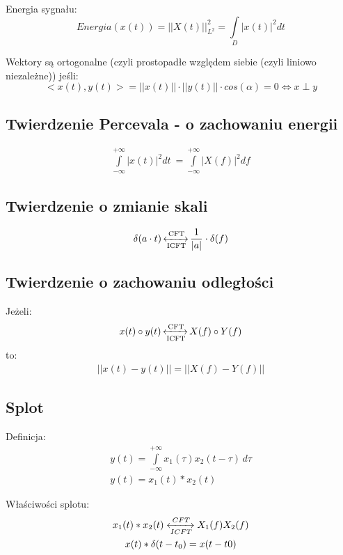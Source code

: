     \noindent
    Energia sygnału:
    \begin{equation*}
        Energia(x(t)) = ||X(t)||^2_{L^2} = \int\limits_D |x(t)|^2dt
    \end{equation*}

    \noindent
    Wektory są ortogonalne (czyli prostopadłe względem siebie (czyli liniowo niezależne)) jeśli:
    \begin{equation*}
        <x(t), y(t)> = ||x(t)|| \cdot ||y(t)|| \cdot cos(\alpha) = 0 \Leftrightarrow x\perp y
    \end{equation*}


    \subsection{Twierdzenie Percevala - o zachowaniu energii}
        \begin{gather*}
            \int\limits^{+\infty}_{-\infty}|x(t)|^2 dt\ = \int\limits^{+\infty}_{-\infty}|X(f)|^2df
        \end{gather*}
    \subsection{Twierdzenie o zmianie skali}
        \begin{gather*}
            \delta(a\cdot t) \operatorname{\xleftrightarrow[\text{ICFT}]{\text{CFT}}} \frac{1}{|a|}\cdot\delta(f)
        \end{gather*}
    \subsection{Twierdzenie o zachowaniu odległości}
        Jeżeli:
        \begin{gather*}
            x(t)\circ y(t) \operatorname{\xleftrightarrow[\text{ICFT}]{\text{CFT}}} X(f)\circ Y(f)
        \end{gather*}
        to:
        \begin{gather*}
            ||x(t) - y(t)|| = ||X(f) - Y(f)||
        \end{gather*}

    \subsection{Splot}
        Definicja:
        \begin{gather*}
            y(t) = \int \limits _{-\infty}^{+\infty}x_1(\tau) x_2(t-\tau) \,d\tau\\
            y(t) = x_1(t)*x_2(t) 
        \end{gather*}

        \noindent
        Właściwości splotu:
        \begin{gather*}
            x_1(t)*x_2(t)\xleftrightarrow[ICFT]{CFT} X_1(f)X_2(f)\\
            x(t)*\delta(t-t_0) = x(t-t0)
        \end{gather*}